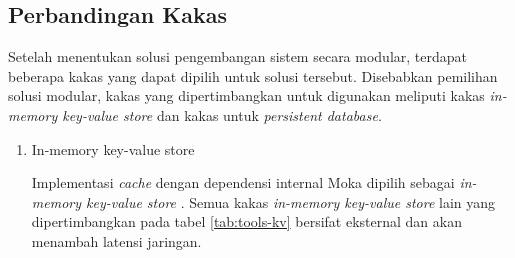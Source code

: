 \subsection{Perbandingan Kakas}
Setelah menentukan solusi pengembangan sistem secara modular, terdapat beberapa kakas yang dapat dipilih untuk solusi tersebut. Disebabkan pemilihan solusi modular, kakas yang dipertimbangkan untuk digunakan meliputi kakas \textit{in-memory key-value store} dan kakas untuk \textit{persistent database}.

\begin{enumerate}
    \item In-memory key-value store
    
    Implementasi \textit{cache} dengan dependensi internal Moka dipilih sebagai \textit{in-memory key-value store} \parencite{moka_rs_github}. Semua kakas \textit{in-memory key-value store} lain yang dipertimbangkan pada tabel \ref{tab:tools-kv} bersifat eksternal dan akan menambah latensi jaringan.


\end{enumerate}
